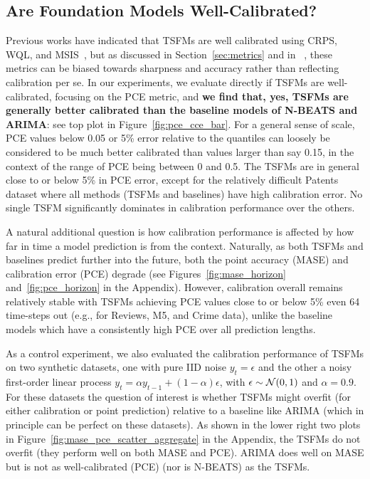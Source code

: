 \documentclass{article}
\begin{document}
\subsection{Are Foundation Models Well-Calibrated?}
Previous works have indicated that TSFMs are well calibrated using CRPS, WQL, and MSIS~\citep{gifteval, tirex}, but as discussed in Section~\ref{sec:metrics} and in ~\citet{beyondpinball}, these metrics can be biased towards sharpness and accuracy rather than reflecting calibration per se.
In our experiments, we evaluate directly if TSFMs are well-calibrated, focusing on the PCE metric, and \textbf{we find that, yes, TSFMs are generally better calibrated than the baseline models of N-BEATS and ARIMA}: see top plot in Figure~\ref{fig:pce_cce_bar}.   
For a general sense of scale, PCE values below 0.05 or 5\% error relative to the quantiles can loosely be considered to be much better calibrated than values larger than say 0.15, in the context of the range of PCE being between 0 and 0.5. 
The TSFMs are in general close to  or below 5\% in PCE error, except for the relatively difficult Patents dataset where all methods (TSFMs and baselines) have high calibration error. 
No single TSFM significantly dominates in calibration performance over the others. 

A natural additional question is how calibration performance is affected by how far in time a model prediction is from the context. 
Naturally, as both TSFMs and baselines predict further into the future, both the point accuracy (MASE) and calibration error (PCE) degrade (see Figures~\ref{fig:mase_horizon} and~\ref{fig:pce_horizon} in the Appendix). 
However, calibration overall remains relatively stable with TSFMs achieving PCE values close to or below 5\% even 64 time-steps out (e.g., for Reviews, M5, and Crime data),  unlike the baseline models which have a consistently high PCE over all prediction lengths.

As a control experiment, we also evaluated the calibration performance of TSFMs on two synthetic datasets, one with pure IID noise $y_t=\epsilon$ and the other a noisy first-order linear process $y_t=\alpha y_{t-1} + (1-\alpha) \epsilon$, with $\epsilon \sim {\cal{N}}(0,1)$ and $\alpha=0.9$. 
For these datasets the question of interest is whether TSFMs might overfit (for either calibration or point prediction) relative to a baseline like ARIMA (which in principle can be perfect on these datasets). 
As shown in the lower right two plots in Figure~\ref{fig:mase_pce_scatter_aggregate} in the Appendix, the TSFMs do not overfit (they perform well on both MASE and PCE). 
ARIMA does well on MASE but is not as well-calibrated (PCE) (nor is N-BEATS) as the TSFMs.
\end{document}
